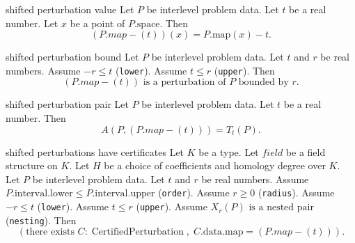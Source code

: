 \begin{cleanresult}{shifted perturbation value}
Let $P$ be interlevel problem data.
Let $t$ be a real number.
Let $x$ be a point of $P.\mathrm{space}$.
Then \[\left(P.map-\left(t\right)\right)(x)=P.\mathrm{map}(x)-t.\]
\end{cleanresult}

\begin{cleanresult}{shifted perturbation bound}
Let $P$ be interlevel problem data.
Let $t$ and $r$ be real numbers.
Assume $-r\le t$ (\texttt{lower}).
Assume $t\le r$ (\texttt{upper}).
Then \[\left(P.map-\left(t\right)\right)\text{ is a perturbation of }P\text{ bounded by }r.\]
\par{}
\end{cleanresult}

\begin{cleanresult}{shifted perturbation pair}
Let $P$ be interlevel problem data.
Let $t$ be a real number.
Then \[A(P,\left(P.map-\left(t\right)\right))=T_{t}(P).\]
\par{}
\end{cleanresult}

\begin{cleanresult}{shifted perturbations have certificates}
Let $K$ be a type.
Let $\mathit{field}$ be a field structure on $K$.
Let $H$ be a choice of coefficients and homology degree over $K$.
Let $P$ be interlevel problem data.
Let $t$ and $r$ be real numbers.
Assume $P.\mathrm{interval}.\mathrm{lower}\le P.\mathrm{interval}.\mathrm{upper}$ (\texttt{order}).
Assume $r\ge 0$ (\texttt{radius}).
Assume $-r\le t$ (\texttt{lower}).
Assume $t\le r$ (\texttt{upper}).
Assume $X_{r}(P)\text{ is a nested pair}$ (\texttt{nesting}).
Then \[\left(\text{there exists }C : \operatorname{CertifiedPerturbation},\; C.\mathrm{data}.\mathrm{map}=\left(P.map-\left(t\right)\right)\right).\]
\par{}
\end{cleanresult}

